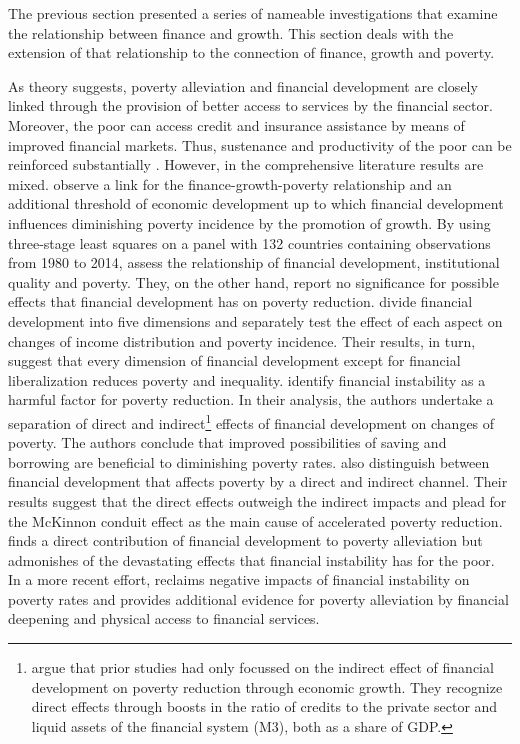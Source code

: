 \documentclass[12pt, a4paper]{article}
\begin{document}
The previous section presented a series of nameable investigations that examine the relationship between finance and growth. This section deals with the extension of that relationship to the connection of finance, growth and poverty.

As theory suggests, poverty alleviation and financial development are closely linked through the provision of better access to services by the financial sector. Moreover, the poor can access credit and insurance assistance by means of improved financial markets. Thus, sustenance and productivity of the poor can be reinforced substantially \cite{jalilian2002}. However, in the comprehensive literature results are mixed.  observe a link for the finance-growth-poverty relationship and an additional threshold of economic development up to which financial development influences diminishing poverty incidence by the promotion of growth. By using three-stage least squares on a panel with 132 countries containing observations from 1980 to 2014,  assess the relationship of financial development, institutional quality and poverty. They, on the other hand, report no significance for possible effects that financial development has on poverty reduction.  divide financial development into five dimensions and separately test the effect of each aspect on changes of income distribution and poverty incidence. Their results, in turn, suggest that every dimension of financial development except for financial liberalization reduces poverty and inequality.   identify financial instability as a harmful factor for poverty reduction. In their analysis, the authors undertake a separation of direct and indirect\footnote{ argue that prior studies had only focussed on the indirect effect of financial development on poverty reduction through economic growth. They recognize direct effects through boosts in the ratio of credits to the private sector and liquid assets of the financial system (M3), both as a share of GDP.} effects of financial development on changes of poverty. The authors conclude that improved possibilities of saving and borrowing are beneficial to diminishing poverty rates.  also distinguish between financial development that affects poverty by a direct and indirect channel. Their results suggest that the direct effects outweigh the indirect impacts and plead for the McKinnon conduit effect as the main cause of accelerated poverty reduction.  finds a direct contribution of financial development to poverty alleviation but admonishes of the devastating effects that financial instability has for the poor. In a more recent effort,  reclaims negative impacts of financial instability on poverty rates and provides additional evidence for poverty alleviation by financial deepening and physical access to financial services.
\end{document}
